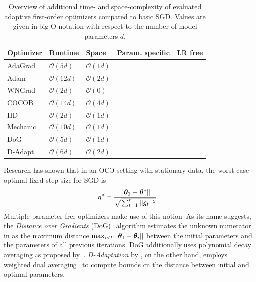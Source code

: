 \documentclass{article} %
\newcommand{\cmark}{\ding{51}} %
\newcommand{\xmark}{\ding{55}} %
\begin{document}
\begin{table}[hb]
   \centering
   \small
   \caption{
      Overview of additional time- and space-complexity of evaluated adaptive first-order optimizers compared to basic SGD.
      Values are given in big O notation with respect to the number of model parameters $d$.
   }\label{tab:param_free_optims}
   \begin{tabular}{@{}lllcc@{}}
      \toprule
      Optimizer                & Runtime            & Space             & Param. specific & LR free \\ \midrule
      AdaGrad                  & $\mathcal{O}(5d)$  & $\mathcal{O}(1d)$ & \cmark          & \xmark  \\
      Adam                     & $\mathcal{O}(12d)$ & $\mathcal{O}(2d)$ & \cmark          & \xmark  \\
      WNGrad                   & $\mathcal{O}(2d)$  & $\mathcal{O}(0)$  & \xmark          & \xmark  \\
      COCOB                    & $\mathcal{O}(14d)$ & $\mathcal{O}(4d)$ & \cmark          & \cmark  \\
      HD\footnotemark[2]       & $\mathcal{O}(2d)$  & $\mathcal{O}(1d)$ & \xmark          & \xmark  \\
      Mechanic\footnotemark[2] & $\mathcal{O}(10d)$ & $\mathcal{O}(1d)$ & \cmark          & \cmark  \\
      DoG                      & $\mathcal{O}(5d)$  & $\mathcal{O}(1d)$ & \xmark          & \cmark  \\
      D-Adapt\footnotemark[2]  & $\mathcal{O}(6d)$  & $\mathcal{O}(2d)$ & \xmark          & \cmark  \\
      \bottomrule
   \end{tabular}
\end{table}

Research has shown that in an OCO setting with stationary data, the worst-case optimal fixed step size for SGD is
\begin{equation}\label{eq:oco_optimal_lr}
   \eta^* = \frac{||{\bm{\theta}}_1 - {\bm{\theta}}^*||}{\sqrt{\sum_{t=1}^{n} ||{\bm{g}}_t||^2}}.
\end{equation}
Multiple parameter-free optimizers make use of this notion.
As its name suggests, the \textit{Distance over Gradients} (DoG)~\citep{ivgiDoGSGDBest2023} algorithm estimates the unknown numerator in  as the maximum distance $\max_{i<t}||{\bm{\theta}}_1 - {\bm{\theta}}_i||$ between the initial parameters and the parameters of all previous iterations.
DoG additionally uses polynomial decay averaging as proposed by~\citet{shamirStochasticGradientDescent2012}.
\textit{D-Adaptation} by \citet{defazioLearningRateFreeLearningDAdaptation2023a}, on the other hand, employs weighted dual averaging~\citep{duchiDualAveragingDistributed2012} to compute bounds on the distance between initial and optimal parameters.
\end{document}
